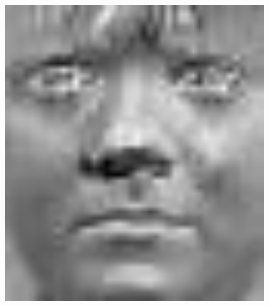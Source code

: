 \documentclass[english,onecolumn]{IEEEtran}
\begin{document}
\begin{enumerate}
\begin{figure}[htbp]
{\begin{minipage}[t]{0.2\linewidth}
            \includegraphics[width=1\textwidth]{figures/p4/problem1/eigenface_2.jpg}
            \end{minipage}
        }
\end{figure}
\end{enumerate}
\end{document}
